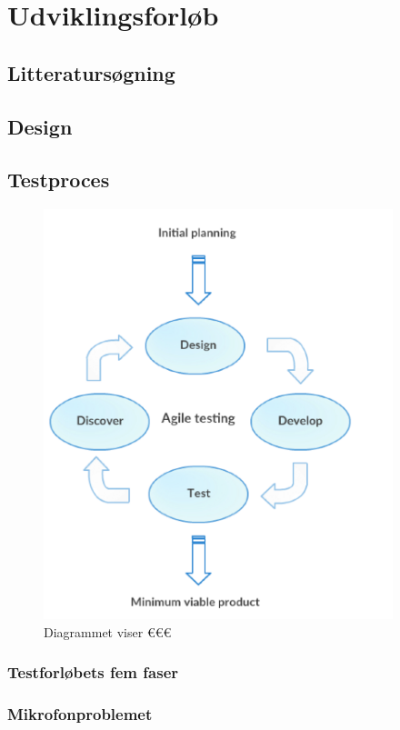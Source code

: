 \chapter{Udviklingsforløb}

\section{Litteratursøgning}
\section{Design}
\section{Testproces}	



			\begin{figure}[htb]
			\centering
				\includegraphics[width=4in]{AgileTesting}
				\caption{Diagrammet viser €€€}	
				\label{fig:agiletesting}
			\end{figure}

\subsection{Testforløbets fem faser}

\subsection{Mikrofonproblemet}

